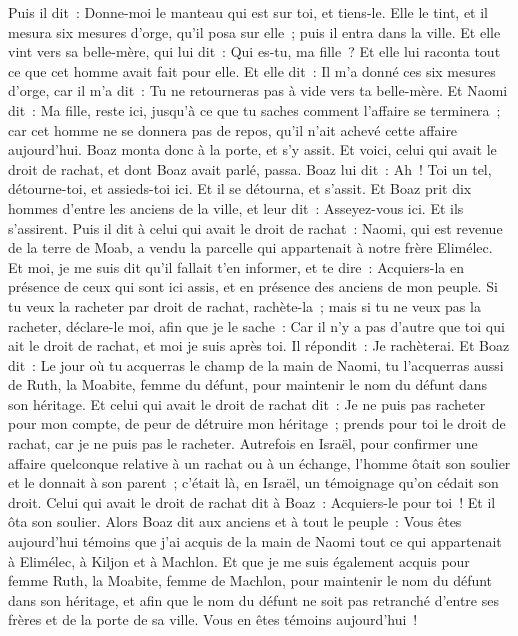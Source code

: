 \begin{multicols}{2}
Puis il dit~: Donne-moi le manteau qui est sur toi, et tiens-le. Elle le tint, et il mesura six mesures d'orge, qu'il posa sur elle~; puis il entra dans la ville.
Et elle vint vers sa belle-mère, qui lui dit~: Qui es-tu, ma fille~? Et elle lui raconta tout ce que cet homme avait fait pour elle.
Et elle dit~: Il m'a donné ces six mesures d'orge, car il m'a dit~: Tu ne retourneras pas à vide vers ta belle-mère.
Et Naomi dit~: Ma fille, reste ici, jusqu'à ce que tu saches comment l'affaire se terminera~; car cet homme ne se donnera pas de repos, qu'il n'ait achevé cette affaire aujourd'hui.
\VerseOne{}Boaz monta donc à la porte, et s'y assit. Et voici, celui qui avait le droit de rachat, et dont Boaz avait parlé, passa. Boaz lui dit~: Ah~! Toi un tel, détourne-toi, et assieds-toi ici. Et il se détourna, et s'assit.
Et Boaz prit dix hommes d'entre les anciens de la ville, et leur dit~: Asseyez-vous ici. Et ils s'assirent.
Puis il dit à celui qui avait le droit de rachat~: Naomi, qui est revenue de la terre de Moab, a vendu la parcelle qui appartenait à notre frère Elimélec.
Et moi, je me suis dit qu'il fallait t'en informer, et te dire~: Acquiers-la en présence de ceux qui sont ici assis, et en présence des anciens de mon peuple. Si tu veux la racheter par droit de rachat, rachète-la~; mais si tu ne veux pas la racheter, déclare-le moi, afin que je le sache~: Car il n'y a pas d'autre que toi qui ait le droit de rachat, et moi je suis après toi. Il répondit~: Je rachèterai.
Et Boaz dit~: Le jour où tu acquerras le champ de la main de Naomi, tu l'acquerras aussi de Ruth, la Moabite, femme du défunt, pour maintenir le nom du défunt dans son héritage.
Et celui qui avait le droit de rachat dit~: Je ne puis pas racheter pour mon compte, de peur de détruire mon héritage~; prends pour toi le droit de rachat, car je ne puis pas le racheter.
Autrefois en Israël, pour confirmer une affaire quelconque relative à un rachat ou à un échange, l'homme ôtait son soulier et le donnait à son parent~; c'était là, en Israël, un témoignage qu'on cédait son droit.
Celui qui avait le droit de rachat dit à Boaz~: Acquiers-le pour toi~! Et il ôta son soulier.
Alors Boaz dit aux anciens et à tout le peuple~: Vous êtes aujourd'hui témoins que j'ai acquis de la main de Naomi tout ce qui appartenait à Elimélec, à Kiljon et à Machlon.
Et que je me suis également acquis pour femme Ruth, la Moabite, femme de Machlon, pour maintenir le nom du défunt dans son héritage, et afin que le nom du défunt ne soit pas retranché d'entre ses frères et de la porte de sa ville. Vous en êtes témoins aujourd'hui~!

\end{multicols}
